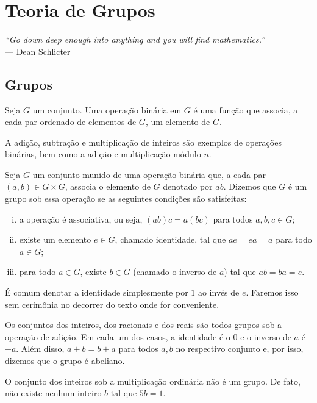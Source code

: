 \chapter[Teoria de Grupos]{Teoria de Grupos}
\label{cap-1}
\chaptermark{}
%
\hfill%
\begin{minipage}{10cm}
\begin{flushright}
\rightskip=0.5cm
\textit{``Go down deep enough into anything and you will find mathematics.''}
\\[0.1cm]
\rightskip=0.5cm
--- Dean Schlicter
\end{flushright}
\end{minipage}

\section{Grupos}
%
\begin{definition}
\label{def-operacao-binaria}
    Seja $G$ um conjunto. Uma operação binária em $G$ é uma função que associa, a cada par ordenado
    de elementos de $G$, um elemento de $G$.
\end{definition}
%
\begin{example}
    A adição, subtração e multiplicação de inteiros são exemplos de operações binárias, bem
    como a adição e multiplicação módulo $n$.
\end{example}
%
\begin{definition}[Grupo]
\label{def-grupo}
    Seja $G$ um conjunto munido de uma operação binária que, a cada par $(a,b)\in G\times G$, associa
    o elemento de $G$ denotado por $ab$. Dizemos que $G$ é um grupo sob essa operação se as seguintes
    condições são satisfeitas:
    \begin{enumerate}[(i)]
        \item a operação é associativa, ou seja, $(ab)c = a(bc)$ para todos $a,b,c\in G$;
        \item existe um elemento $e\in G$, chamado identidade, tal que $ae = ea = a$ para todo $a\in G$;
        \item para todo $a\in G$, existe $b\in G$ (chamado o inverso de $a$) tal que $ab = ba = e$.
    \end{enumerate}
\end{definition}
%
\begin{remark}
    É comum denotar a identidade simplesmente por $1$ ao invés de $e$. Faremos isso sem cerimônia
    no decorrer do texto onde for conveniente.
\end{remark}
%
\begin{example}
    Os conjuntos dos inteiros, dos racionais e dos reais são todos grupos sob a operação de adição.
    Em cada um dos casos, a identidade é o 0 e o inverso de $a$ é $-a$. Além disso, $a+b = b+a$ para
    todos $a,b$ no respectivo conjunto e, por isso, dizemos que o grupo é abeliano.
\end{example}
%
\begin{example}
    O conjunto dos inteiros sob a multiplicação ordinária não é um grupo. De fato, não existe
    nenhum inteiro $b$ tal que $5b = 1$.
\end{example}
%
